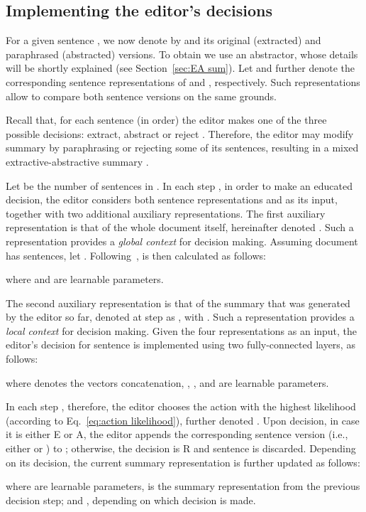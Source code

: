 \documentclass{article}
\begin{document}
\subsection{Implementing the editor's decisions}
For a given sentence , we now denote by  and  its original (extracted) and paraphrased (abstracted) versions.
To obtain  we use an abstractor, whose details will be shortly explained (see Section~\ref{sec:EA sum}). Let  and  further denote the corresponding sentence representations of  and , respectively. Such representations allow to compare both sentence versions on the same grounds.

Recall that, for each sentence  (in order) the editor makes one of the three possible decisions: extract, abstract or reject .
Therefore, the editor may modify summary  by paraphrasing or rejecting some of its sentences, resulting in a mixed extractive-abstractive summary .

Let  be the number of sentences in . In each step , in order to make an educated decision, the editor considers both sentence representations  and  as its input, together with two additional auxiliary representations. The first auxiliary representation is that of the whole document  itself, hereinafter denoted . Such a representation provides a \textit{global context} for decision making. Assuming document  has  sentences, let . Following~\cite{ChenFastAS2018,Wu2018LearningTE},  is then calculated as follows:


where  and  are learnable parameters.

The second auxiliary representation is that of the summary that was generated by the editor so far, denoted at step  as , with . Such a representation provides a \textit{local context} for decision making. Given the four representations as an input, the editor's decision for sentence  is implemented using two fully-connected layers, as follows:


where  denotes the vectors concatenation, , ,  and  are learnable parameters.

In each step , therefore, the editor chooses the action  with the highest likelihood (according to Eq.~\ref{eq:action likelihood}), further denoted . Upon decision, in case it is either \textsf{E} or \textsf{A}, the editor appends the corresponding sentence version (i.e., either  or ) to ; otherwise, the decision is \textsf{R} and sentence  is discarded. Depending on its decision, the current summary representation is further updated as follows:


where  are learnable parameters,  is the summary representation from the previous decision step; and , depending on which decision is made.
\end{document}

